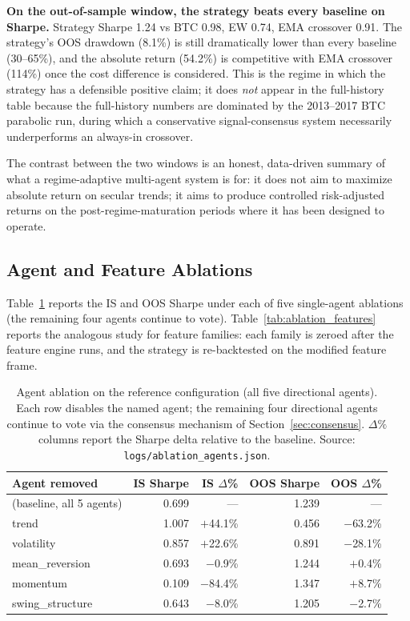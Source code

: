 \documentclass{article}
\begin{document}
\textbf{On the out-of-sample window, the strategy beats every baseline on Sharpe.} Strategy Sharpe 1.24 vs BTC 0.98, EW 0.74, EMA crossover 0.91. The strategy's OOS drawdown (8.1\%) is still dramatically lower than every baseline (30--65\%), and the absolute return (54.2\%) is competitive with EMA crossover (114\%) once the cost difference is considered. This is the regime in which the strategy has a defensible positive claim; it does \emph{not} appear in the full-history table because the full-history numbers are dominated by the 2013--2017 BTC parabolic run, during which a conservative signal-consensus system necessarily underperforms an always-in crossover.

The contrast between the two windows is an honest, data-driven summary of what a regime-adaptive multi-agent system is for: it does not aim to maximize absolute return on secular trends; it aims to produce controlled risk-adjusted returns on the post-regime-maturation periods where it has been designed to operate.

\subsection{Agent and Feature Ablations}
\label{sec:ablations}

Table~\ref{tab:ablation_agents} reports the IS and OOS Sharpe under each of five single-agent ablations (the remaining four agents continue to vote).
Table~\ref{tab:ablation_features} reports the analogous study for feature families: each family is zeroed after the feature engine runs, and the strategy is re-backtested on the modified feature frame.

\begin{table}[h]
\centering
\caption{Agent ablation on the reference configuration (all five directional agents). Each row disables the named agent; the remaining four directional agents continue to vote via the consensus mechanism of Section~\ref{sec:consensus}. $\Delta\%$ columns report the Sharpe delta relative to the baseline. Source: \texttt{logs/ablation\_agents.json}.}
\label{tab:ablation_agents}
\small
\begin{tabular}{@{}lrrrr@{}}
\toprule
\textbf{Agent removed}  & \textbf{IS Sharpe} & \textbf{IS $\Delta$\%} & \textbf{OOS Sharpe} & \textbf{OOS $\Delta$\%} \\
\midrule
(baseline, all 5 agents) & 0.699 & --- & 1.239 & --- \\
\midrule
trend            & 1.007 & $+$44.1\% & 0.456 & $-$63.2\% \\
volatility       & 0.857 & $+$22.6\% & 0.891 & $-$28.1\% \\
mean\_reversion   & 0.693 & $-$0.9\% & 1.244 & $+$0.4\% \\
momentum         & 0.109 & $-$84.4\% & 1.347 & $+$8.7\% \\
swing\_structure & 0.643 & $-$8.0\% & 1.205 & $-$2.7\% \\
\bottomrule
\end{tabular}
\end{table}
\end{document}
